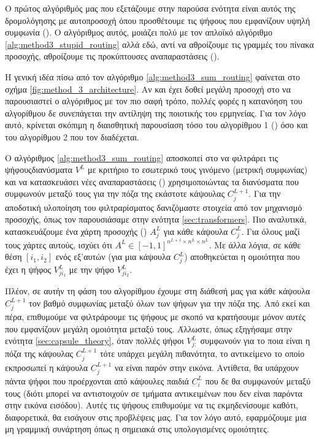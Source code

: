 Ο πρώτος αλγόριθμός μας που εξετάζουμε στην παρούσα ενότητα είναι αυτός της δρομολόγησης με αυτο\textendash προσοχή όπου προσθέτουμε τις ψήφους που εμφανίζουν υψηλή συμφωνία (). Ο αλγόριθμος αυτός, μοιάζει πολύ με τον απλοϊκό αλγόριθμο \ref{alg:method3_stupid_routing} αλλά εδώ, αντί να αθροίζουμε τις γραμμές του πίνακα προσοχής, αθροίζουμε τις προκύπτουσες αναπαραστάσεις (). \par

Η γενική ιδέα πίσω από τον αλγόριθμο \ref{alg:method3_sum_routing} φαίνεται στο σχήμα \ref{fig:method_3_architecture}. Αν και έχει δοθεί μεγάλη προσοχή στο να παρουσιαστεί ο αλγόριθμος με τον πιο σαφή τρόπο, πολλές φορές η κατανόηση του αλγορίθμου δε συνεπάγεται την αντίληψη της ποιοτικής του ερμηνείας. Για τον λόγο αυτό, κρίνεται σκόπιμη η διαισθητική παρουσίαση τόσο του αλγορίθμου 1 () όσο και του αλγορίθμου 2 που τον διαδέχεται. \par

Ο αλγόριθμος \ref{alg:method3_sum_routing} αποσκοπεί στο να φιλτράρει τις ψήφους\textendash διανύσματα $V^L$ με κριτήριο το εσωτερικό τους γινόμενο (μετρική συμφωνίας) και να κατασκευάσει νέες αναπαραστάσεις () χρησιμοποιώντας τα διανύσματα που συμφωνούν μεταξύ τους για την πόζα της εκάστοτε κάψουλας $C_j^{L+1}$. Για την αποδοτική υλοποίηση του φιλτραρίσματος δανιζόμαστε στοιχεία από τον μηχανισμό προσοχής, όπως τον παρουσιάσαμε στην ενότητα \ref{sec:transformers}. Πιο αναλυτικά, κατασκευάζουμε ένα χάρτη προσοχής () $A_j^L$ για κάθε κάψουλα $C_j^L$. Για όλους μαζί τους χάρτες αυτούς, ισχύει ότι $A^L \in [-1,1]^{n^{L+1} \times n^L \times n^L}$. Με άλλα λόγια, σε κάθε θέση $[i_1,i_2]$ ενός εξ'αυτών (για μια κάψουλα $C_j^L$) αποθηκεύεται η ομοιότητα που έχει η ψήφος $V^L_{ji_1}$ με την ψήφο $V_{ji_2}^L$.\par

Πλέον, σε αυτήν τη φάση του αλγορίθμου έχουμε στη διάθεσή μας για κάθε κάψουλα $C_j^{L+1}$ τον βαθμό συμφωνίας μεταξύ όλων των ψήφων για την πόζα της. Από εκεί και πέρα, επιθυμούμε να φιλτράρουμε τις ψήφους με σκοπό να κρατήσουμε μόνον αυτές που εμφανίζουν μεγάλη ομοιότητα μεταξύ τους. Άλλωστε, όπως εξηγήσαμε στην ενότητα \ref{sec:capsule_theory}, όταν πολλές ψήφοι $V_{j:}^L$ συμφωνούν για το ποια είναι η πόζα της κάψουλας $C_j^{L+1}$ τότε υπάρχει μεγάλη πιθανότητα, το αντικείμενο το οποίο εκπροσωπεί η κάψουλα $C_j^{L+1}$ να είναι παρόν στην εικόνα. Αντίθετα, θα υπάρχουν πάντα ψήφοι που προέρχονται από κάψουλες παιδιά $C_i^L$ που δε θα συμφωνούν μεταξύ τους (διότι μπορεί να αντιστοιχούν σε τμήματα αντικειμένων που δεν είναι παρόντα στην εικόνα εισόδου). Αυτές τις ψήφους επιθυμούμε να τις εκμηδενίσουμε καθότι, διαφορετικά, θα εισάγουν  στις προβλέψεις μας. Για τον λόγο αυτό, εφαρμόζουμε μια μη γραμμική συνάρτηση όπως η  σημειακά στις υπολογισμένες ομοιότητες. \par

